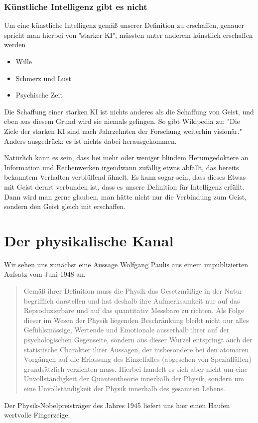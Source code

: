 \documentclass[12pt]{book}
\begin{document}
\subsection{Künstliche Intelligenz gibt es nicht}

Um eine künstliche Intelligenz gemäß unserer Definition zu erschaffen, genauer spricht man hierbei von "starker KI", müssten unter anderem künstlich erschaffen werden

\begin{itemize}
\item Wille
\item Schmerz und Lust
\item Psychische Zeit
\end{itemize}

Die Schaffung einer starken KI ist nichts anderes als die Schaffung von Geist, und eben aus diesem Grund wird sie niemals gelingen. So gibt Wikipedia zu:
"Die Ziele der starken KI sind nach Jahrzehnten der Forschung weiterhin visionär." Anders ausgedrück: es ist nichts dabei herausgekommen.

Natürlich kann es sein, dass bei mehr oder weniger blindem Herumgedoktere an Information und Rechenwerken irgendwann zufällig etwas abfällt, das bereits bekanntem Verhalten verblüffend ähnelt. Es kann sogar sein, dass dieses Etwas mit Geist derart verbunden ist, dass es unsere Definition für Intelligenz erfüllt. Dann wird man gerne glauben, man hätte nicht nur die Verbindung zum Geist, sondern den Geist gleich mit erschaffen. 

\chapter{Der physikalische Kanal}
Wir sehen uns zunächst eine Aussage Wolfgang Paulis aus einem unpublizierten Aufsatz vom Juni 1948 an.
\begin{quote}\begin{tcolorbox}
Gemäß ihrer Definition muss die Physik das Gesetzmäßige in der Natur begrifflich darstellen und hat deshalb ihre Aufmerksamkeit nur auf das Reproduzierbare und auf das quantitativ Messbare zu richten. Als Folge dieser im Wesen der Physik liegenden Beschränkung bleibt nicht nur alles Gefühlsmässige, Wertende und Emotionale ausserhalb ihrer auf der psychologischen Gegenseite, sondern aus dieser Wurzel entspringt auch der statistische Charakter ihrer Aussagen, der insbesondere bei den atomaren Vorgängen auf die Erfassung des Einzelfalles (abgesehen von Spezialfällen) grundsätzlich verzichten muss. Hierbei handelt es sich aber nicht um eine Unvollständigkeit der Quantentheorie innerhalb der Physik, sondern um eine Unvollständigkeit der Physik innerhalb des gesamten Lebens.
\end{tcolorbox}\end{quote}
Der Physik-Nobelpreisträger des Jahres 1945 liefert uns hier einen Haufen wertvolle Fingerzeige.
\end{document}
